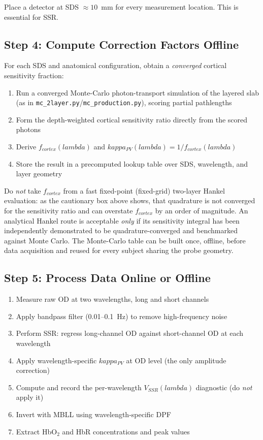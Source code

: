 \documentclass[12pt]{article}
\def\kappa{kappa}%
\def\lambda{lambda}%
\def\mathrm#1{#1}%
\def\text#1{#1}%
\begin{document}
Place a detector at SDS $\approx 10$~mm for every measurement location. This is essential for SSR.

\subsection{Step 4: Compute Correction Factors Offline}

For each SDS and anatomical configuration, obtain a \emph{converged} cortical sensitivity fraction:

\begin{enumerate}
\item Run a converged Monte-Carlo photon-transport simulation of the layered slab (as in \texttt{mc\_2layer.py}/\texttt{mc\_production.py}), scoring partial pathlengths
\item Form the depth-weighted cortical sensitivity ratio directly from the scored photons
\item Derive $f_{\text{cortex}}(\lambda)$ and $\kappa_{\text{PV}}(\lambda) = 1/f_{\text{cortex}}(\lambda)$
\item Store the result in a precomputed lookup table over SDS, wavelength, and layer geometry
\end{enumerate}

Do \emph{not} take $f_{\text{cortex}}$ from a fast fixed-point (fixed-grid) two-layer Hankel evaluation: as the cautionary box above shows, that quadrature is not converged for the sensitivity ratio and can overstate $f_{\text{cortex}}$ by an order of magnitude. An analytical Hankel route is acceptable \emph{only} if its sensitivity integral has been independently demonstrated to be quadrature-converged and benchmarked against Monte Carlo. The Monte-Carlo table can be built once, offline, before data acquisition and reused for every subject sharing the probe geometry.

\subsection{Step 5: Process Data Online or Offline}

\begin{enumerate}
\item Measure raw OD at two wavelengths, long and short channels
\item Apply bandpass filter (0.01--0.1~Hz) to remove high-frequency noise
\item Perform SSR: regress long-channel OD against short-channel OD at each wavelength
\item Apply wavelength-specific $\kappa_{\text{PV}}$ at OD level (the only amplitude correction)
\item Compute and record the per-wavelength $V_{\mathrm{SSR}}(\lambda)$ diagnostic (do \emph{not} apply it)
\item Invert with MBLL using wavelength-specific DPF
\item Extract HbO$_2$ and HbR concentrations and peak values
\end{enumerate}
\end{document}

